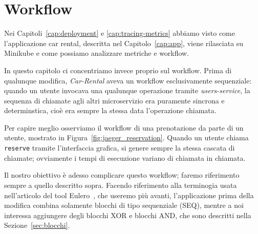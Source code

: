 \chapter{Workflow}
Nei Capitoli~\ref{cap:deployment} e \ref{cap:tracing-metrics} abbiamo visto come l'applicazione car rental, descritta nel Capitolo~\ref{cap:app}, viene rilasciata su Minikube e come possiamo analizzare metriche e workflow.

In questo capitolo ci concentriamo invece proprio sul workflow. Prima di qualunque modifica, \textit{Car-Rental} aveva un workflow esclusivamente sequenziale: quando un utente invocava una qualunque operazione tramite \textit{users-service}, la sequenza di chiamate agli altri microservizio era puramente sincrona e determinstica, cioè era sempre la stessa data l'operazione chiamata.

Per capire meglio osserviamo il workflow di una prenotazione da parte di un utente, mostrato in Figura~\ref{fig:jaeger_reservation}. Quando un utente chiama \texttt{reserve} tramite l'interfaccia grafica, si genere sempre la stessa cascata di chiamate; ovviamente i tempi di esecuzione variano di chiamata in chiamata.

\myskip

Il nostro obiettivo è adesso complicare questo workflow; faremo riferimento sempre a quello descritto sopra. Facendo riferimento alla terminogia usata nell'articolo del tool Eulero~\cite{carnevali2023compositional}, che useremo più avanti, l'applicazione prima della modifica combina solamente blocchi di tipo sequenziale (SEQ), mentre a noi interessa aggiungere degli blocchi XOR e blocchi AND, che sono descritti nella Sezione~\ref{sec:blocchi}.


